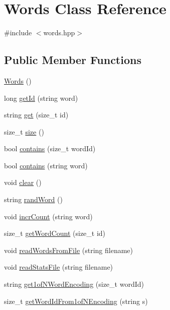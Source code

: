 \hypertarget{class_words}{
\section{Words Class Reference}
\label{class_words}
}


{\ttfamily \#include $<$words.hpp$>$}

\subsection*{Public Member Functions}
\begin{DoxyCompactItemize}
\item 
\hyperlink{class_words_a7bf5a1cffddebace28da162a366fed0c}{Words} ()
\item 
long \hyperlink{class_words_a40260667759acea2b21647f51659580a}{getId} (string word)
\item 
string \hyperlink{class_words_a41cf976d022be36c2dcf57977f463f5b}{get} (size\_\-t id)
\item 
size\_\-t \hyperlink{class_words_a706c072736f1129d0a13f47d94614ff3}{size} ()
\item 
bool \hyperlink{class_words_a1fb2f028a8c2868286db3457a35b7b67}{contains} (size\_\-t wordId)
\item 
bool \hyperlink{class_words_af031f07fa8b3798d83348df0e822a9f2}{contains} (string word)
\item 
void \hyperlink{class_words_a9423f1c5b91eb1f687b423576b9f72b9}{clear} ()
\item 
string \hyperlink{class_words_aff5f07ad739bf8b4b9de0e05caf42a76}{randWord} ()
\item 
void \hyperlink{class_words_a0fbf822903274918a58037d28ed67705}{incrCount} (string word)
\item 
size\_\-t \hyperlink{class_words_ac6811af00f05b5083e4d1d13f1cd03ce}{getWordCount} (size\_\-t id)
\item 
void \hyperlink{class_words_aa5d7388fc0d464db38f60dbfcb4bd875}{readWordsFromFile} (string filename)
\item 
void \hyperlink{class_words_afc57ba78c1c58691216fc92dedb427c7}{readStatsFile} (string filename)
\item 
string \hyperlink{class_words_a11b5b68cd2d4ed55e903a1604b3877e1}{get1ofNWordEncoding} (size\_\-t wordId)
\item 
size\_\-t \hyperlink{class_words_aff70348fa0446494c90ba0a89e793297}{getWordIdFrom1ofNEncoding} (string s)
\end{DoxyCompactItemize}
